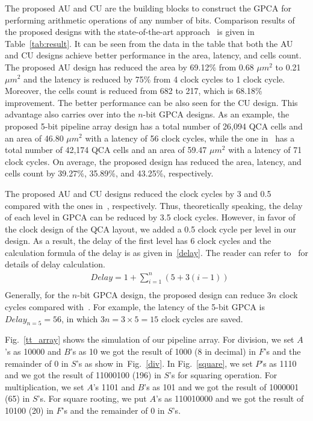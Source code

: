 \documentclass[9pt,journal,compsoc]{IEEEtran}
\begin{document}
The proposed AU and CU are the building blocks to construct the GPCA for performing arithmetic operations of any number of bits.
Comparison results of the proposed designs with the state-of-the-art approach~\cite{2} is given in Table~\ref{tab:result}.
It can be seen from the data in the table that both the AU and CU designs achieve better performance in the area, latency, and cells count.
The proposed AU design has reduced the area by 69.12\% from 0.68 $\mu m^2$ to 0.21 $\mu m^2$ and the latency is reduced by 75\% from 4 clock cycles to 1 clock cycle. Moreover, the cells count is reduced from 682 to 217, which is 68.18\% improvement. The better performance can be also seen for the CU design.    
This advantage also carries over into the $n$-bit GPCA designs. As an example, the proposed 5-bit pipeline array design has a total number of 26,094 QCA cells and an area of 46.80 $\mu m^2$ with a latency of 56 clock cycles, while the one in~\cite{2} has a total number of 42,174 QCA cells and an area of 59.47 $\mu m^2$ with a latency of 71 clock cycles. On average, the proposed design has reduced the area, latency, and cells count by 39.27\%, 35.89\%, and 43.25\%, respectively.  

The proposed AU and CU designs reduced the clock cycles by 3 and 0.5 compared with the ones in~\cite{2}, respectively. Thus, theoretically speaking, the delay of each level in GPCA can be reduced by 3.5 clock cycles. However, in favor of the clock design of the QCA layout, we added a 0.5 clock cycle per level in our design. 
As a result, the delay of the first level has 6 clock cycles and the calculation formula of the delay is as given in~\eqref{delay}. The reader can refer to~\cite{2} for details of delay calculation.
\begin{equation}\label{delay}
\begin{split}
& Delay =1 + \sum\limits_{i=1}^{n}(5  + 3(i-1))\\
\end{split}
\end{equation} 
Generally, for the $n$-bit GPCA design, the proposed design can reduce $3n$ clock cycles compared with~\cite{2}.
For example, the latency of the 5-bit GPCA is $Delay_{n=5}=56$, in which $3n=3 \times 5=15$ clock cycles are saved. 

Fig.~\ref{tt_array} shows the simulation of our pipeline array. For division, we set $A$'s as 10000 and $B$'s as 10 we got the result of 1000 (8 in decimal) in $F$'s and the remainder of 0 in $S$'s as show in~Fig.~\ref{div}. In Fig.~\ref{square}, we set $P$'s as 1110 and we got the result of 11000100 (196) in $S$'s for squaring operation. For multiplication, we set $A$'s 1101 and $B$'s as 101 and we got the result of 1000001 (65) in $S$'s. For square rooting, we put $A$'s as 110010000 and we got the result of 10100 (20) in $F$'s and the remainder of $0$ in $S$'s.
\end{document}
